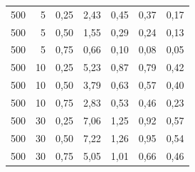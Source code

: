 {\begin{longtable}{@{}rrrrrrr@{}}
    500 & 5 & 0,25 & 2,43 & 0,45 & 0,37 & 0,17 \\
    500 & 5 & 0,50 & 1,55 & 0,29 & 0,24 & 0,13 \\
    500 & 5 & 0,75 & 0,66 & 0,10 & 0,08 & 0,05 \\
    500 & 10 & 0,25 & 5,23 & 0,87 & 0,79 & 0,42 \\
    500 & 10 & 0,50 & 3,79 & 0,63 & 0,57 & 0,40 \\
    500 & 10 & 0,75 & 2,83 & 0,53 & 0,46 & 0,23 \\
    500 & 30 & 0,25 & 7,06 & 1,25 & 0,92 & 0,57 \\
    500 & 30 & 0,50 & 7,22 & 1,26 & 0,95 & 0,54 \\
    500 & 30 & 0,75 & 5,05 & 1,01 & 0,66 & 0,46 \\
\end{longtable}
}
